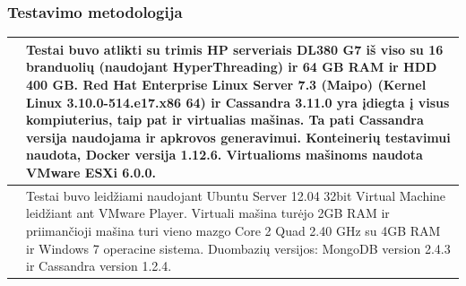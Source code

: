 \documentclass{VUMIFPSkursinis}
\begin{document}
		\subsubsection{Testavimo metodologija}
			
		\begin{center}
		\begin{tabular}{ | m{5em} | m{10cm}| } 
		\hline
		\cite{BITCass}& Testai buvo atlikti su trimis HP serveriais DL380
		G7 iš viso su 16 branduolių (naudojant HyperThreading) ir 64 GB RAM ir HDD 400
		GB. Red Hat Enterprise Linux Server 7.3 (Maipo) (Kernel
		Linux 3.10.0-514.e17.x86 64) ir Cassandra 3.11.0 yra įdiegta į visus kompiuterius, taip pat ir virtualias mašinas. Ta pati Cassandra versija naudojama ir apkrovos generavimui. 
		Konteinerių testavimui naudota,
		Docker versija 1.12.6. Virtualioms mašinoms naudota VMware ESXi 6.0.0.\\ 
		\hline
		\cite{BITCass}&  Testai buvo leidžiami naudojant
		Ubuntu Server 12.04 32bit Virtual Machine leidžiant ant VMware Player.
 		Virtuali mašina turėjo 2GB RAM ir priimančioji mašina turi vieno mazgo Core 2 Quad 2.40
		GHz su 4GB RAM ir Windows 7 operacine sistema. Duombazių versijos: MongoDB version 2.4.3
		ir Cassandra version 1.2.4. \\ 
		\hline
		\end{tabular}
		\end{center}
\end{document}
